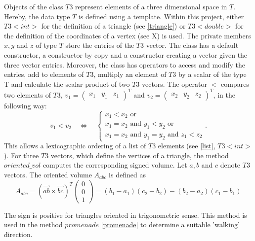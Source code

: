 \documentclass[10pt]{article}
\begin{document}
Objects of the class $T3$ represent elements of a three dimensional space in $T$. Hereby, the data type $T$ is defined using a template. Within this project, either $T3<int>$ for the definition of a triangle (see \ref{triangle}) or $T3<double>$ for the definition of the coordinates of a vertex (see X) is used. The private members $x,y$ and $z$ of type $T$ store the entries of the $T3$ vector. The class has a default constructor, a constructor by copy and a constructor creating a vector given the three vector entries. Moreover, the class has operators to access and modify the entries, add to elements of $T3$, multiply an element of $T3$ by a scalar of the type T and calculate the scalar product of two $T3$ vectors. The operator $<$ compares two elements of $T3$, $v_1 = \begin{pmatrix} x_1 & y_1 & z_1 \end{pmatrix}^T$ and $v_2 = \begin{pmatrix} x_2 & y_2 & z_2 \end{pmatrix}^T$, in the following way:
$$ v_1 < v_2 \quad \Leftrightarrow \quad \begin{cases}
 x_1 < x_2 \text{ or }\\
 x_1 = x_2 \text{ and } y_1 < y_2 \text{ or }\\
 x_1 = x_2 \text{ and } y_1 = y_2 \text{ and } z_1 < z_2
\end{cases}. $$ 
This allows a lexicographic ordering of a list of $T3$ elements (see \ref{list}, $T3<int>$). For three $T3$ vectors, which define the vertices of a triangle, the method $ oriented\_vol $ computes the corresponding signed volume. Let $a,b$ and $c$ denote $T3$ vectors. The oriented volume $A_{abc}$ is defined as
$$ A_{abc} = \left( \overrightarrow{ab} \times \overrightarrow{bc} \right)^T \begin{pmatrix} 0 \\ 0 \\ 1 \end{pmatrix} = (b_1-a_1)(c_2-b_2) - (b_2-a_2)(c_1-b_1)$$

The sign is positive for triangles oriented in trigonometric sense. This method is used in the method $promenade$ \ref{promenade} to determine a suitable 'walking' direction.
\end{document}
